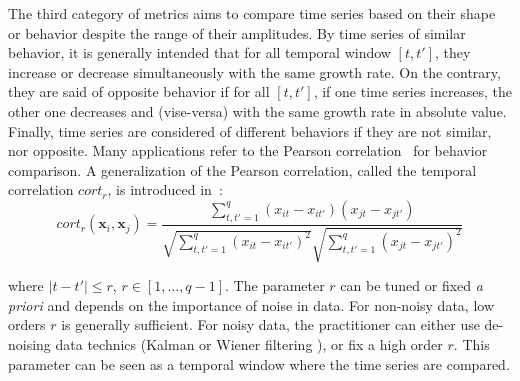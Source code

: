 The third category of metrics aims to compare time series based on their shape or behavior despite the range of their amplitudes. By time series of similar behavior, it is generally intended that for all temporal window $[t,t']$, they increase or decrease simultaneously with the same growth rate. On the contrary, they are said of opposite behavior if for all $[t,t']$, if one time series increases, the other one decreases and (vise-versa) with the same growth rate in absolute value. Finally, time series are considered of different behaviors if they are not similar, nor opposite. Many applications refer to the Pearson correlation~\cite{Abraham2010a,Benesty2009} for behavior comparison. A generalization of the Pearson correlation, called the temporal correlation $cort_r$, is introduced in~\cite{Douzal-Chouakria2003,AhlameDouzal-Chouakria2012,Chouakria2007}: 
\begin{equation}	
	cort_r(\textbf{x}_i,\textbf{x}_j) = 
	\frac{
		\sum\limits_{t,t'=1}^q 
		{
			(x_{it}-x_{it'})
			(x_{jt}-x_{jt'})
		}
	}
	{
		\sqrt{
			\sum\limits_{t,t'=1}^q  
			{(x_{it}-x_{it'})^2}
		} 
		\sqrt{
			\sum\limits_{t,t'=1}^q  
			{(x_{jt}-x_{jt'})^2}
		} 	 
	}
\label{eq:corTr}
\end{equation}

\noindent where $|t-t'| \leq r$, $r \in [1,..., q-1]$. The parameter $r$ can be tuned or fixed \textit{a priori} and depends on the importance of noise in data. For non-noisy data, low orders $r$ is generally sufficient. For noisy data, the practitioner can either use de-noising data technics (Kalman or Wiener filtering \cite{Kalman1960,WienerN1942}), or fix a high order $r$. This parameter can be seen as a temporal window where the time series are compared.


